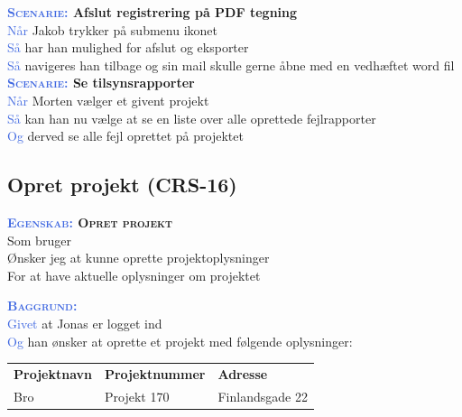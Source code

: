 \textbf{\textsc{\textcolor{RoyalBlue}{Scenarie:}} Afslut registrering på PDF tegning}\\
\textcolor{RoyalBlue}{Når} Jakob trykker på submenu ikonet\\
\textcolor{RoyalBlue}{Så}  har han mulighed for afslut og eksporter\\
\textcolor{RoyalBlue}{Så}  navigeres han tilbage og sin mail skulle gerne åbne med en vedhæftet word fil\\


\textbf{\textsc{\textcolor{RoyalBlue}{Scenarie:}} Se tilsynsrapporter}\\
\textcolor{RoyalBlue}{Når} Morten vælger et givent projekt\\
\textcolor{RoyalBlue}{Så} kan han nu vælge at se en liste over alle oprettede fejlrapporter\\
\textcolor{RoyalBlue}{Og} derved se alle fejl oprettet på projektet\\


\subsection{Opret projekt (CRS-16)} \label{sec:USOpretProjekt}
\textbf{\textsc{\textcolor{RoyalBlue}{Egenskab:} Opret projekt}}\\
Som bruger\\
Ønsker jeg at kunne oprette projektoplysninger\\
For at have aktuelle oplysninger om projektet

\textsc{\textcolor{RoyalBlue}{\textbf{Baggrund:}}}\\
\textcolor{RoyalBlue}{Givet} at Jonas er logget ind\\
\textcolor{RoyalBlue}{Og} han ønsker at oprette et projekt med følgende oplysninger:\\
\begin{tabular}{| l | l | l |}
	\textbf{Projektnavn} & \textbf{Projektnummer} & \textbf{Adresse} \\
	Bro & Projekt 170 & Finlandsgade 22 \\
\end{tabular}
\newline \newline

